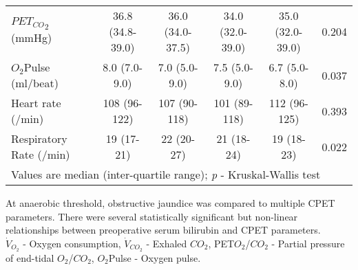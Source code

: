 \begin{sidewaystable}[p]
\begin{tabular}{|l| c c c c c|}
		${PET_{CO}}_2$ (mmHg)          & 36.8 (34.8-39.0)    & 36.0 (34.0-37.5)    & 34.0 (32.0-39.0)    & 35.0 (32.0-39.0)    & 0.204      \\
		$O_2$Pulse (ml/beat)           & 8.0 (7.0-9.0)       & 7.0 (5.0-9.0)       & 7.5 (5.0-9.0)       & 6.7 (5.0-8.0)       & 0.037      \\
		Heart rate (/min)              & 108 (96-122)        & 107 (90-118)        & 101 (89-118)        & 112 (96-125)        & 0.393      \\
		Respiratory Rate (/min)        & 19 (17-21)          & 22 (20-27)          & 21 (18-24)          & 19 (18-23)          & 0.022      \\ \hline
		\multicolumn{6}{l}{Values are median (inter-quartile range); \textit{p} - Kruskal-Wallis test}
	\end{tabular}
	\medskip
	\begin{flushleft}
		At anaerobic threshold, obstructive jaundice was compared to multiple CPET parameters. There were several statistically significant but non-linear relationships between preoperative serum bilirubin and CPET parameters. \\
		$\dot{V}_{O_2}$ - Oxygen consumption, $\dot{V}_{CO_2}$ - Exhaled $CO_2$, PET$O_2$/$CO_2$ - Partial pressure of end-tidal $O_2$/$CO_2$, $O_2$Pulse - Oxygen pulse.
	\end{flushleft}
\end{sidewaystable}


